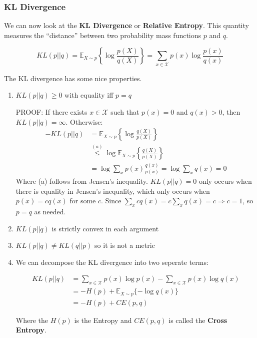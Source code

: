 \documentclass[]{article}
\theoremstyle{mattstyle}
\theoremstyle{definition}
\begin{document}
\subsubsection{KL Divergence}
We can now look at the \textbf{KL Divergence} or \textbf{Relative Entropy}. This quantity measures the ``distance'' between two probability mass functions $p$ and $q$.

\begin{equation}
KL(p||q) = \mathbb{E}_{X\sim p}\left\{\log \frac{p(X)}{q(X)}\right\} = \sum_{x\in\mathcal{X}}p(x)\log\frac{p(x)}{q(x)}
\end{equation}

The KL divergence has some nice properties.
\begin{enumerate}
	\item $KL(p||q) \ge 0$ with equality iff $p=q$
	
	PROOF: If there exists $x \in \mathcal{X}$ such that $p(x) = 0$ and $q(x) > 0$, then $KL(p || q) = \infty$.	Otherwise:
	\begin{align*}
	-KL(p||q) &= \mathbb{E}_{X\sim p}\left\{\log \frac{q(X)}{p(X)}\right\}\\
	&\overset{(a)}{\le} \log \mathbb{E}_{X\sim p}\left\{\frac{q(X)}{p(X)}\right\} \\
	&= \log \sum_{x} p(x)\frac{q(x)}{p(x)} = \log \sum_{x} q(x) = 0
	\end{align*}
	Where (a) follows from Jensen's inequality. $KL(p||q) = 0$ only occurs when there is equality in Jensen's inequality, which only occurs when $p(x)=cq(x)$ for some $c$. Since $\sum_{x}cq(x) = c\sum_{x}q(x) = c \Rightarrow c=1$, so $p=q$ as needed.
	
	\item $KL(p||q)$ is strictly convex in each argument
	
	\item $KL(p||q) \ne KL(q||p)$ so it is not a metric
	
	\item We can decompose the KL divergence into two seperate terms:
	
	\begin{align} KL(p||q) &= \sum_{x\in\mathcal{X}}p(x)\log p(x) - \sum_{x\in\mathcal{X}}p(x)\log q(x) \\
	&= -H(p) + \mathbb{E}_{X\sim p}\{-\log q(x)\} \\
	&= -H(p) + CE(p,q)
	\end{align}
	
	Where the $H(p)$ is the Entropy and $CE(p,q)$ is called the \textbf{Cross Entropy}.
	
\end{enumerate}
\end{document}
